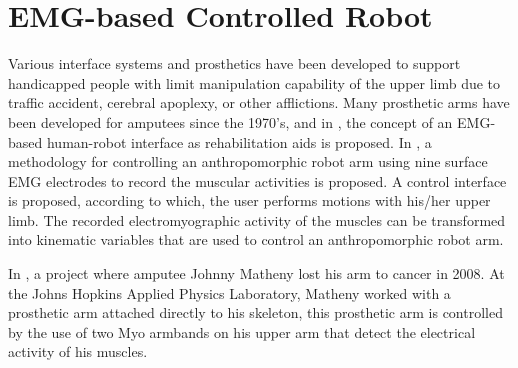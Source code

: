 \section{EMG-based Controlled Robot}
Various interface systems and prosthetics have been developed to support handicapped people with limit manipulation capability of the upper limb due to traffic accident, cerebral apoplexy, or other afflictions. Many prosthetic arms have been developed for amputees since the 1970’s, and in \cite{fukuda1998emg}, the concept of an EMG-based human-robot interface as rehabilitation aids is proposed. In \cite{artemiadis2010emg}, a methodology for controlling an anthropomorphic robot arm using nine surface EMG electrodes to record the muscular activities is proposed. A control interface is proposed, according to which, the user performs motions with his/her upper limb. The recorded electromyographic activity of the muscles can be transformed into kinematic variables that are used to control an anthropomorphic robot arm.

In \cite{cnet:myoarm}, a project where amputee Johnny Matheny lost his arm to cancer in 2008. At the Johns Hopkins Applied Physics Laboratory, Matheny worked with a prosthetic arm attached directly to his skeleton, this prosthetic arm is controlled by the use of two Myo armbands on his upper arm that detect the electrical activity of his muscles.